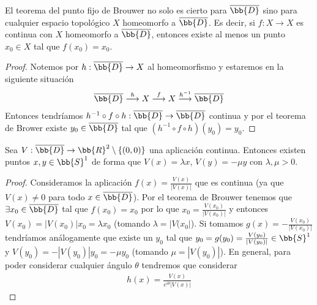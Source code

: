 \begin{observacion}
    El teorema del punto fijo de Brouwer no solo es cierto para $\overline{\bb{D}}$ sino para cualquier espacio topológico $X$ homeomorfo a $\overline{\bb{D}}$. Es decir, si $f:X\to X$ es continua con $X$ homeomorfo a $\overline{\bb{D}}$, entonces existe al menos un punto $x_0\in X$ tal que $f(x_0)=x_0$.

    \begin{proof}
        Notemos por $h:\overline{\bb{D}}\to X$ al homeomorfismo y estaremos en la siguiente situación
        \begin{gather*}
            \overline{\bb{D}} \overset{h}{\longrightarrow} X \overset{f}{\longrightarrow} X \overset{h^{-1}}{\longrightarrow} \overline{\bb{D}}
        \end{gather*}
        Entonces tendríamos $h^{-1}\circ f \circ h : \overline{\bb{D}} \to \overline{\bb{D}}$ continua y por el teorema de Brower existe $y_0\in \overline{\bb{D}}$ tal que $(h^{-1}\circ f \circ h)(y_0) = y_0$.
    \end{proof}
\end{observacion}

\begin{coro}
    Sea $V:\overline{\bb{D}}\to \bb{R}^2 \setminus \{(0,0)\}$ una aplicación continua. Entonces existen puntos $x,y\in \bb{S}^1$ de forma que $V(x) = \lambda x$, $V(y) = -\mu y$ con $\lambda, \mu >0$.

    \begin{proof}
        Consideramos la aplicación $f(x) = \frac{V(x)}{|V(x)|}$ que es continua (ya que $V(x)\neq 0$ para todo $x\in \overline{{\bb{D}}}$). Por el teorema de Brouwer tenemos que $\exists x_0\in \overline{\bb{D}}$ tal que $f(x_0) = x_0$ por lo que $x_0 = \frac{V(x_0)}{|V(x_0)|}$ y entonces $V(x_0) = |V(x_0)|x_0 = \lambda x_0$ (tomando $\lambda = |V(x_0|$). Si tomamos $g(x) = - \frac{V(x_0)}{|V(x_0)|}$ tendríamos análogamente que existe un $y_0$ tal que $y_0 = g(y_0) = \frac{V(y_0)}{|V(y_0)|}\in \bb{S}^1$ y $V(y_0) = -|V(y_0)|y_0 = -\mu y_0$ (tomando $\mu = |V(y_0)|$). En general, para poder considerar cualquier ángulo $\theta$ tendremos que considerar
        \begin{gather*}
            h(x) = \frac{V(x)}{e^{i\theta} |V(x)|}
        \end{gather*}
    \end{proof}
\end{coro}

